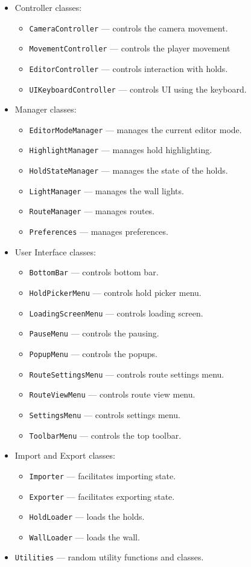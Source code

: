 \begin{itemize}
	\item Controller classes:
	\begin{itemize}
		\item \verb|CameraController| --- controls the camera movement.
		\item \verb|MovementController| --- controls the player movement
		\item \verb|EditorController| --- controls interaction with holds.
		\item \verb|UIKeyboardController| --- controls UI using the keyboard.
	\end{itemize}
	\item Manager classes:
	\begin{itemize}
		\item \verb|EditorModeManager| --- manages the current editor mode.
		\item \verb|HighlightManager| --- manages hold highlighting.
		\item \verb|HoldStateManager| --- manages the state of the holds.
		\item \verb|LightManager| --- manages the wall lights.
		\item \verb|RouteManager| --- manages routes.
		\item \verb|Preferences| --- manages preferences.
	\end{itemize}
	\item User Interface classes:
	\begin{itemize}
		\item \verb|BottomBar| --- controls bottom bar.
		\item \verb|HoldPickerMenu| --- controls hold picker menu.
		\item \verb|LoadingScreenMenu| --- controls loading screen.
		\item \verb|PauseMenu| --- controls the pausing.
		\item \verb|PopupMenu| --- controls the popups.
		\item \verb|RouteSettingsMenu| --- controls route settings menu.
		\item \verb|RouteViewMenu| --- controls route view menu.
		\item \verb|SettingsMenu| --- controls settings menu.
		\item \verb|ToolbarMenu| --- controls the top toolbar.
	\end{itemize}
	\item Import and Export classes:
	\begin{itemize}
		\item \verb|Importer| --- facilitates importing state.
		\item \verb|Exporter| --- facilitates exporting state.
		\item \verb|HoldLoader| --- loads the holds.
		\item \verb|WallLoader| --- loads the wall.
	\end{itemize}
	\item \verb|Utilities| --- random utility functions and classes.
\end{itemize}

